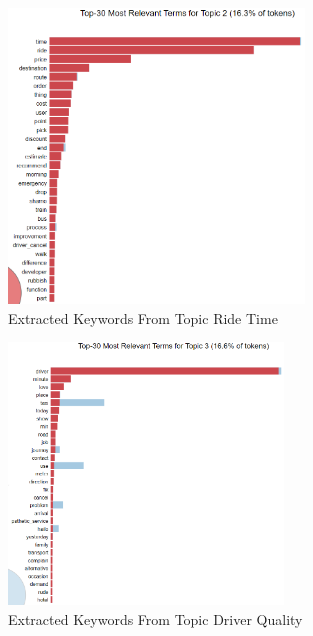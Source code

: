 \documentclass[12pt]{article}
\begin{document}
\begin{figure}[h]
    \centering
    \includegraphics[width=0.7\textwidth]{figures/topic_ride_time.png}
    \caption{Extracted Keywords From Topic Ride Time}
    \label{fig:my_label}
\end{figure}

\begin{figure}[h]
    \centering
    \includegraphics[width=0.65\textwidth]{figures/topic_driver_quality.png}
    \caption{Extracted Keywords From Topic Driver Quality}
    \label{fig:my_label}
\end{figure}
\end{document}
